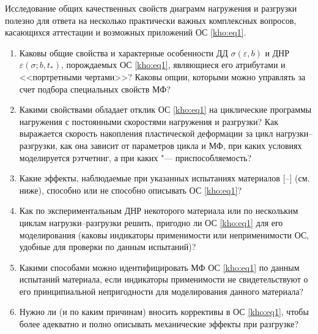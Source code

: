 Исследование общих качественных свойств диаграмм нагружения и разгрузки полезно для ответа на несколько практически важных комплексных вопросов, касающихся аттестации и возможных приложений ОС \eqref{kho:eq1}. 

\begin{enumerate}

\item[1.] Каковы общие свойства и характерные особенности ДД $\sigma(\varepsilon,b)$ и ДНР $\varepsilon(\sigma;b,t_\ast)$, порождаемых ОС \eqref{kho:eq1}, являющиеся его атрибутами и <<портретными чертами>>? Каковы опции, которыми можно управлять за счет подбора специальных свойств МФ?

\item[2.] Какими свойствами обладает отклик ОС \eqref{kho:eq1} на циклические программы нагружения с постоянными скоростями нагружения и разгрузки? Как выражается скорость накопления пластической деформации за цикл нагрузки--разгрузки, как она зависит от параметров цикла и МФ, при каких условиях моделируется рэтчетинг, а при каких "--- приспособляемость? 

\item[3.] Какие эффекты, наблюдаемые при указанных испытаниях материалов [--] (см. ниже), способно или не способно описывать ОС \eqref{kho:eq1}? 

\item[4.] Как по экспериментальным ДНР некоторого материала или по нескольким циклам нагрузки--разгрузки решить, пригодно ли ОС \eqref{kho:eq1} для его моделирования (каковы индикаторы применимости или неприменимости ОС, удобные для проверки по данным испытаний)?

\item[5.] Какими способами можно идентифицировать МФ ОС \eqref{kho:eq1} по данным испытаний материала, если индикаторы применимости не свидетельствуют о его принципиальной непригодности для моделирования данного материала?

\item[6.] Нужно ли (и по каким причинам) вносить коррективы в ОС \eqref{kho:eq1}, чтобы более адекватно и полно описывать механические эффекты при разгрузке?

\end{enumerate}



\smallskip



\hypertarget{kh:punkt1}{} 



